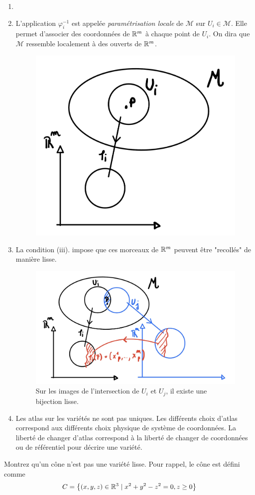\begin{rmk} 
    \begin{enumerate}
        \item[\,] 
        \item L'application $\varphi_i^{-1}$ est appelée \emph{paramétrisation locale} de $\mathcal{M}$ sur $U_i\in \mathcal{M}$. Elle permet d'associer des coordonnées de $\mathbb{R}^m$ à chaque point de $U_i$. On dira que $\mathcal{M}$ ressemble localement à des ouverts de $\mathbb{R}^m$.
        \begin{figure}[H]
            \centering
            \includegraphics[width=0.3\linewidth]{Chapitres/3.Element de géométrie différentielle/Images/variété.jpg}
            \caption{}
            \label{fig:3.1}
        \end{figure}
        \item La condition (iii). impose que ces morceaux de $\mathbb{R}^m$ peuvent être "recollés" de manière lisse.
        \begin{figure}[H]
            \centering
            \includegraphics[width=0.5\linewidth]{Chapitres/3.Element de géométrie différentielle/Images/ouvertchevauchement.jpg}
            \caption{Sur les images de l'intersection de $U_i$ et $U_j$, il existe une bijection lisse.}
            \label{fig:3.1}
        \end{figure}
        \item Les atlas sur les variétés ne sont pas uniques. Les différents choix d'atlas correspond aux différents choix physique de système de coordonnées. La liberté de changer d'atlas correspond à la liberté de changer de coordonnées ou de référentiel pour décrire une variété.
    \end{enumerate}
\end{rmk}
    \begin{exerc}
        Montrez qu'un cône n'est pas une variété lisse. Pour rappel, le cône est défini comme 
        \begin{equation}
            C = \left\{ (x,y,z)\in \mathbb{R}^3 \mid x^2+y^2-z^2=0, z\geq 0 \right\}
        \end{equation}
    \end{exerc}
